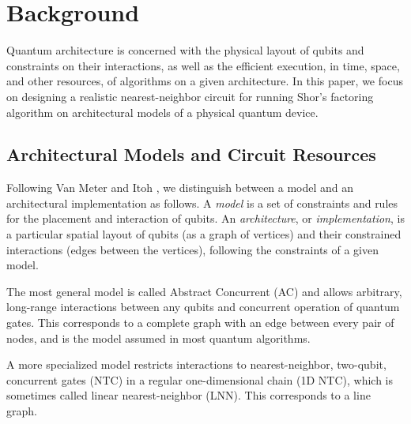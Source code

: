 \documentclass[twoside]{article}
\begin{document}
%
\section{Background}
\label{sec:bg}

Quantum architecture is concerned with the physical layout of
qubits and constraints on their interactions,
as well as the efficient execution, in time, space, and other resources, of
algorithms on a given architecture.
In this paper, we focus on designing a realistic nearest-neighbor circuit for running
Shor's factoring algorithm on architectural models of a physical quantum device.

\subsection{Architectural Models and Circuit Resources}
\label{subsec:models}

Following Van Meter and Itoh \cite{VanMeter2005},
we distinguish between a model and an architectural implementation as follows.
A \emph{model} is a set of constraints and rules for the placement and
interaction of qubits.
An \emph{architecture}, or \emph{implementation}, is a particular
spatial layout of qubits (as a graph of vertices) and their
constrained interactions (edges between the vertices),
following the constraints of a given model.

The most general model is called Abstract Concurrent (\textsc{AC})
and allows arbitrary, long-range interactions between any qubits and concurrent
operation of quantum gates.
This corresponds to a complete graph with an edge between every pair of nodes,
and is the model assumed in most quantum algorithms.

A more specialized model restricts interactions to nearest-neighbor, two-qubit,
concurrent gates (\textsc{NTC}) in a regular one-dimensional chain (1D NTC),
which is sometimes called linear nearest-neighbor (\textsc{LNN}).
This corresponds to a line graph.
\end{document}
